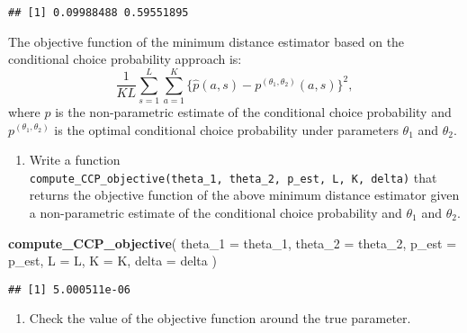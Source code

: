 \documentclass[
]{book}
\newenvironment{Shaded}{\begin{snugshade}}{\end{snugshade}}
\newcommand{\AttributeTok}[1]{\textcolor[rgb]{0.13,0.29,0.53}{#1}}
\newcommand{\FunctionTok}[1]{\textcolor[rgb]{0.13,0.29,0.53}{\textbf{#1}}}
\newcommand{\NormalTok}[1]{#1}
\providecommand{\tightlist}{%
  \setlength{\itemsep}{0pt}\setlength{\parskip}{0pt}}
\begin{document}
\begin{verbatim}
## [1] 0.09988488 0.59551895
\end{verbatim}

The objective function of the minimum distance estimator based on the conditional choice probability approach is:
\[
\frac{1}{KL}\sum_{s = 1}^L \sum_{a = 1}^K\{\hat{p}(a, s) - p^{(\theta_1, \theta_2)}(a, s)\}^2,
\]
where \(\hat{p}\) is the non-parametric estimate of the conditional choice probability and \(p^{(\theta_1, \theta_2)}\) is the optimal conditional choice probability under parameters \(\theta_1\) and \(\theta_2\).

\begin{enumerate}
\def\labelenumi{\arabic{enumi}.}
\setcounter{enumi}{5}
\tightlist
\item
  Write a function \texttt{compute\_CCP\_objective(theta\_1,\ theta\_2,\ p\_est,\ L,\ K,\ delta)} that returns the objective function of the above minimum distance estimator given a non-parametric estimate of the conditional choice probability and \(\theta_1\) and \(\theta_2\).
\end{enumerate}

\begin{Shaded}
\begin{Highlighting}[]
\FunctionTok{compute\_CCP\_objective}\NormalTok{(}
  \AttributeTok{theta\_1 =}\NormalTok{ theta\_1, }
  \AttributeTok{theta\_2 =}\NormalTok{ theta\_2, }
  \AttributeTok{p\_est =}\NormalTok{ p\_est,}
  \AttributeTok{L =}\NormalTok{ L, }
  \AttributeTok{K =}\NormalTok{ K, }
  \AttributeTok{delta =}\NormalTok{ delta}
\NormalTok{  )}
\end{Highlighting}
\end{Shaded}

\begin{verbatim}
## [1] 5.000511e-06
\end{verbatim}

\begin{enumerate}
\def\labelenumi{\arabic{enumi}.}
\setcounter{enumi}{2}
\tightlist
\item
  Check the value of the objective function around the true parameter.
\end{enumerate}
\end{document}
